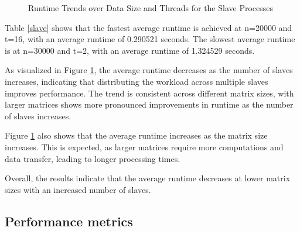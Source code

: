\documentclass[journal]{./IEEE/IEEEtran}
\begin{document}
\begin{figure}
    \centering
    \caption{Runtime Trends over Data Size and Threads for the Slave Processes}
    \label{plot_slave}
\end{figure}

Table \ref{slave} shows that the fastest average runtime is achieved at n=20000 and t=16, with an average runtime of 0.290521 seconds. The slowest average runtime is at n=30000 and t=2, with an average runtime of 1.324529 seconds.

As visualized in Figure \ref{plot_slave}, the average runtime decreases as the number of slaves increases, indicating that distributing the workload across multiple slaves improves performance. The trend is consistent across different matrix sizes, with larger matrices shows more pronounced improvements in runtime as the number of slaves increases.

Figure \ref{plot_slave} also shows that the average runtime increases as the matrix size increases. This is expected, as larger matrices require more computations and data transfer, leading to longer processing times.

Overall, the results indicate that the average runtime decreases at lower matrix sizes with an increased number of slaves.

\subsection{Performance metrics}
\end{document}
